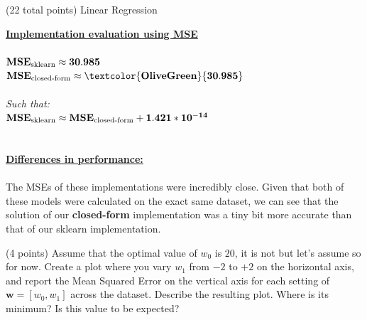 \documentclass[12pt]{article}
\begin{document}
\begin{question}{(22 total points) Linear Regression}
\begin{subquestion}
\begin{answerbox}{20em}
\large{\textbf{\underline{Implementation evaluation using MSE}}}\\
\\
\normalsize{
$\mathbf{MSE\textsubscript{sklearn} \approx 30.985}$\\
$\mathbf{MSE\textsubscript{closed-form} \approx \textcolor{OliveGreen}{30.985}}$\\
\\
\emph{Such that:}\\
$\mathbf{MSE\textsubscript{sklearn} \approx MSE\textsubscript{closed-form}   +   1.421 * 10^{-14}}$\\
\\
\\
\textbf{\underline{Differences in performance:}}\\
\\
The MSEs of these implementations were incredibly close. Given that both of these models were calculated on the exact same dataset, we can see that the solution of our \textbf{closed-form} implementation was a tiny bit more accurate than that of our sklearn implementation.
}
\end{answerbox}



\end{subquestion}




%
%
\begin{subquestion}{(4 points) Assume that the optimal value of $w_0$ is $20$, it is not but let's assume so for now. 
Create a plot where you vary $w_1$ from $-2$ to $+2$ on the horizontal axis, and report the Mean Squared Error on the vertical axis for each setting of $\mathbf{w} = [w_0, w_1]$ across the dataset. 
Describe the resulting plot. Where is its minimum? Is this value to be expected?\\ 
}



\end{subquestion}
\end{question}
\end{document}
